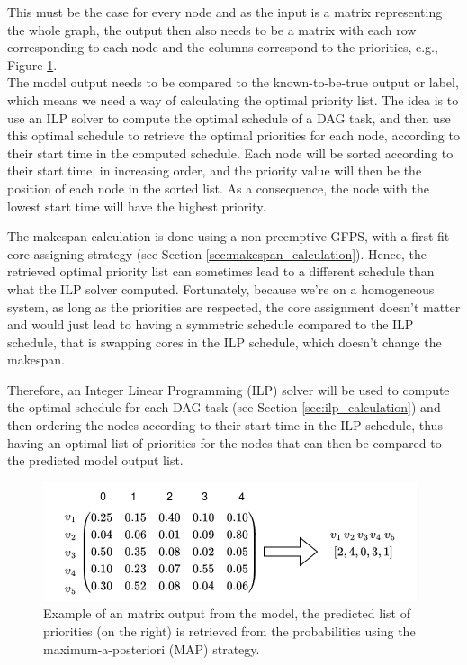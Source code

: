 This must be the case for every node and as the input 
is a matrix representing the whole graph, 
the output then also needs to be a matrix with 
each row corresponding to each node and the columns
correspond to the priorities, e.g., Figure \ref{fig:dag_output_matrix_example}.
\\

The model output needs to be compared to the known-to-be-true output or label,
which means we need a way of calculating the optimal priority list.
The idea is to use an ILP solver to compute the optimal schedule 
of a DAG task, and then use this optimal schedule to retrieve 
the optimal priorities for each node, according to their start time
in the computed schedule.
Each node will be sorted according to their start time, in increasing order,
and the priority value will then be the position of each node in the sorted list.
As a consequence, the node with the lowest start time will
have the highest priority.

The makespan calculation is done using a non-preemptive GFPS,
with a first fit core assigning strategy (see Section \ref{sec:makespan_calculation}). Hence,
the retrieved optimal priority list can sometimes 
lead to a different schedule than what the ILP solver computed.
Fortunately, because we're on a homogeneous system,
as long as the priorities are respected, the core assignment 
doesn't matter and would just lead to having a symmetric schedule
compared to the ILP schedule,
that is swapping cores in the ILP schedule, which doesn't change the makespan.

Therefore, an Integer Linear Programming (ILP) solver will be used to compute
the optimal schedule for each DAG task (see Section \ref{sec:ilp_calculation}) and then
ordering the nodes according to their start time in the ILP schedule,
thus having an optimal list of priorities for the nodes that can then be compared to
the predicted model output list.

\begin{figure}
    \centering
    \includegraphics[width=\linewidth]{images/output_matrix_example.drawio.png}
    \caption{Example of an matrix output from the model, the predicted list of priorities (on the right)
    is retrieved from the probabilities using the maximum-a-posteriori (MAP) strategy.}
    \label{fig:dag_output_matrix_example}
\end{figure}

